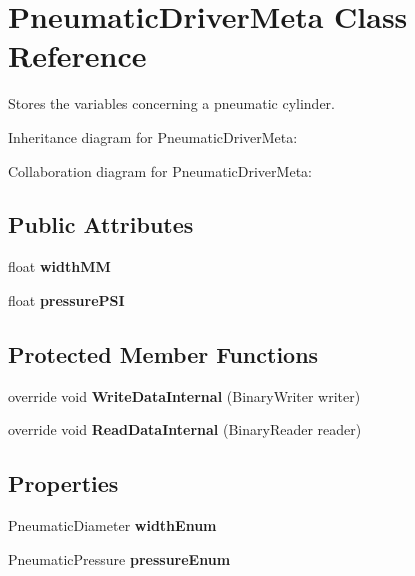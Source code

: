 \hypertarget{class_pneumatic_driver_meta}{}\section{Pneumatic\+Driver\+Meta Class Reference}
\label{class_pneumatic_driver_meta}


Stores the variables concerning a pneumatic cylinder.  




Inheritance diagram for Pneumatic\+Driver\+Meta\+:


Collaboration diagram for Pneumatic\+Driver\+Meta\+:
\subsection*{Public Attributes}
\begin{DoxyCompactItemize}
\item 
\mbox{\label{class_pneumatic_driver_meta_a19b6b4cb0f2480b52f339330dd6c9f82}} 
float {\bfseries width\+MM}
\item 
\mbox{\label{class_pneumatic_driver_meta_a30013defad51924eb3840287ee3ffc4a}} 
float {\bfseries pressure\+P\+SI}
\end{DoxyCompactItemize}
\subsection*{Protected Member Functions}
\begin{DoxyCompactItemize}
\item 
\mbox{\label{class_pneumatic_driver_meta_aa233c2dfc6aa2378c9e0decdb2745f23}} 
override void {\bfseries Write\+Data\+Internal} (Binary\+Writer writer)
\item 
\mbox{\label{class_pneumatic_driver_meta_a355c4290eb11a470976812d86df71754}} 
override void {\bfseries Read\+Data\+Internal} (Binary\+Reader reader)
\end{DoxyCompactItemize}
\subsection*{Properties}
\begin{DoxyCompactItemize}
\item 
\mbox{\label{class_pneumatic_driver_meta_a58656a767088fbd3812e684bada0458c}} 
Pneumatic\+Diameter {\bfseries width\+Enum}
\item 
\mbox{\label{class_pneumatic_driver_meta_a27744874856bfdfc01983442fe9a3f6d}} 
Pneumatic\+Pressure {\bfseries pressure\+Enum}
\end{DoxyCompactItemize}
